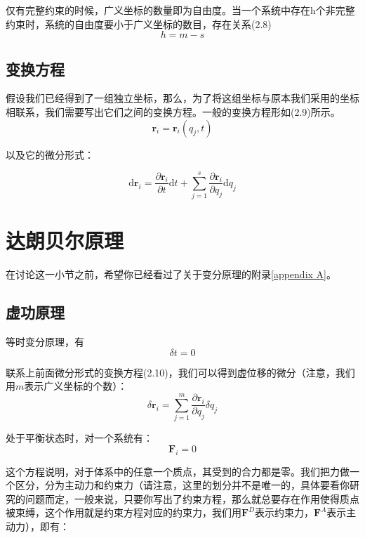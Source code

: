 \documentclass[a4paper, 10pt, openany]{book}%
\begin{document}
   仅有完整约束的时候，广义坐标的数量即为自由度。当一个系统中存在h个非完整约束时，系统的自由度要小于广义坐标的数目，存在关系(2.8)
   \begin{equation}
    h=m-s
   \end{equation}
   

   \subsection{变换方程}

   假设我们已经得到了一组独立坐标，那么，为了将这组坐标与原本我们采用的坐标相联系，我们需要写出它们之间的变换方程。一般的变换方程形如(2.9)所示。
   \begin{equation}
    \textbf{r}_i=\textbf{r}_i(q_j,t)
   \end{equation}

   以及它的微分形式：

   \begin{equation}
    \mathrm{d}\textbf{r}_i=\frac{\partial \textbf{r}_i}{\partial t}\mathrm{d}t+\sum_{j=1}^s \frac{\partial \textbf{r}_i}{\partial q_j}\mathrm{d}q_j
   \end{equation}
   \section{达朗贝尔原理}
   \label{2.2}
  在讨论这一小节之前，希望你已经看过了关于变分原理的附录\ref{appendix A}。
   \subsection{虚功原理}
   
   等时变分原理，有
   \begin{equation}
    \delta t=0
   \end{equation}
   
   联系上前面微分形式的变换方程(2.10)，我们可以得到虚位移的微分（注意，我们用$m$表示广义坐标的个数）：
   \begin{equation}
    \delta \textbf{r}_i=\sum_{j=1}^m \frac{\partial \textbf{r}_i}{\partial q_j}\delta q_j
   \end{equation}

   处于平衡状态时，对一个系统有：
   \begin{equation}
   \textbf{F}_i=0
   \end{equation}

   这个方程说明，对于体系中的任意一个质点，其受到的合力都是零。我们把力做一个区分，分为主动力和约束力（请注意，这里的划分并不是唯一的，具体要看你研究的问题而定，一般来说，只要你写出了约束方程，那么就总要存在作用使得质点被束缚，这个作用就是约束方程对应的约束力，我们用$\textbf{F}^D$表示约束力，$\textbf{F}^A$表示主动力），即有：
  
\end{document}

